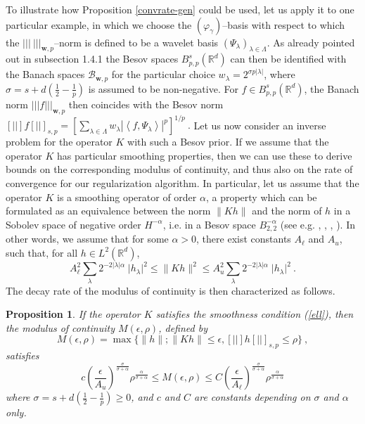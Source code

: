 \documentclass[10pt]{article}
\newtheorem{proposition}[theorem]{Proposition}
\def\R{\mathbb{R}}
\def\vpg{\varphi_{\gamma}}
\def\Vvert{\vert\!\vert\!\vert}
\def\VVert{[\!|\!|\!]}
\begin{document}
\bigskip

To illustrate how Proposition \ref{convrate-gen} could be used, let us apply
it to one particular example, in which we choose
the $(\vpg)$--basis with respect to which
the $\Vvert~\Vvert_{\mathbf{w},p}$--norm is defined to be a wavelet basis
$(\Psi_\lambda)_{\lambda \in \Lambda}$. As
already pointed out in subsection 1.4.1
the Besov spaces $B^s_{p,p}(\R^d)$ can then be identified with the Banach
spaces
$\mathcal{B}_{\mathbf{w},p}$ for the particular choice $w_\lambda =
2^{\sigma  p
|\lambda|}$, where $\sigma = s + d\left( \frac{1}{2}-\frac{1}{p} \right)$
is assumed to be non-negative. For $f \in B^s_{p,p}(\R^d)$, the Banach norm
$\Vvert f \Vvert_{\mathbf{w},p}$ then coincides with the Besov norm
$\VVert f \VVert_{s,p} = \left[ \sum_{\lambda \in \Lambda} w_{\lambda}
|\left<f,\Psi_\lambda \right>|^p \right]^{1/p} ~.$
Let us now consider an inverse problem for the operator $K$ with such a
Besov prior.
If we assume that the operator
$K$ has particular smoothing properties, then we can
use these to derive bounds on the corresponding modulus of continuity, and thus
also on the rate of convergence for our regularization algorithm.
In particular, let us assume that the operator $K$ is a smoothing
operator of order
$\alpha$, a property which can be formulated as an equivalence between the norm
$\| Kh\|$ and the norm of $h$ in a Sobolev space of
negative order $H^{-\alpha}$, i.e. in a Besov space $B^{-\alpha}_{2,2}$
(see e.g.
\cite{Eng96}, \cite{Lou97}, \cite{DeV98}, \cite{Coh02}). In other words,
we assume that
for some $\alpha >0$, there exist constants  $A_{\ell}$ and $A_u$,  such that,
for all $h \in L^2(\R^d)$,
\begin{equation}
\label{ell}
A_{\ell}^2 \sum_\lambda 2^{-2\vert\lambda\vert\alpha}\; \vert
h_\lambda\vert^2 \leq \| K h\|^2 \leq A_u^2\sum_\lambda
2^{-2\vert\lambda\vert\alpha}\;
\vert h_\lambda\vert^2\ .
\end{equation}
The decay rate of the modulus of continuity is then characterized as follows.
\begin{proposition}
If the operator $K$ satisfies the smoothness condition {\rm(\ref{ell})},
then the
modulus of continuity $M(\epsilon,\rho)$, defined by
$$
M(\epsilon,\rho)= \max\{ \|h\|; \|K h\| \leq \epsilon,
\VVert h \VVert_{s,p} \le \rho \} ~,
$$
satisfies
\begin{equation}
\label{M}
c \left( \frac{\epsilon}{A_u} \right)^{\frac{\sigma}{\sigma+\alpha}}
\rho^{\frac{\alpha}{\sigma+\alpha}} \leq M(\epsilon,\rho) \leq C
\left( \frac{\epsilon}{A_\ell}\right)^{\frac{\sigma}{\sigma+\alpha}}
\rho^{\frac{\alpha}{\sigma+\alpha}}
\end{equation}
where $\sigma = s + d\left( \frac{1}{2}-\frac{1}{p} \right)\geq0$,
and $c$ and $C$ are constants depending on $\sigma$
and $\alpha$ only.
\end{proposition}
\end{document}
